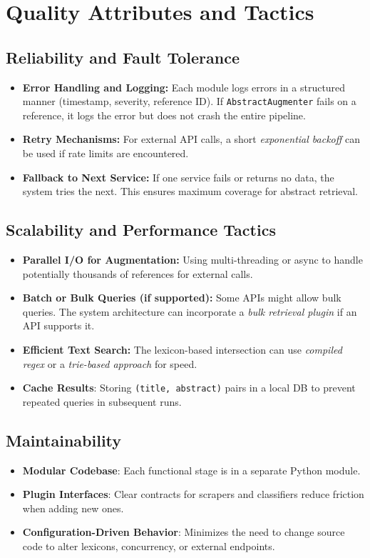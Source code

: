 \documentclass[12pt]{article}
\begin{document}
\section{Quality Attributes and Tactics}

\subsection{Reliability and Fault Tolerance}
\begin{itemize}
  \item \textbf{Error Handling and Logging:} Each module logs errors in a structured manner (timestamp, severity, reference ID). If \texttt{AbstractAugmenter} fails on a reference, it logs the error but does not crash the entire pipeline.
  \item \textbf{Retry Mechanisms:} For external API calls, a short \emph{exponential backoff} can be used if rate limits are encountered.
  \item \textbf{Fallback to Next Service:} If one service fails or returns no data, the system tries the next. This ensures maximum coverage for abstract retrieval.
\end{itemize}

\subsection{Scalability and Performance Tactics}
\begin{itemize}
  \item \textbf{Parallel I/O for Augmentation:} Using multi-threading or async to handle potentially thousands of references for external calls.
  \item \textbf{Batch or Bulk Queries (if supported):} Some APIs might allow bulk queries. The system architecture can incorporate a \emph{bulk retrieval plugin} if an API supports it.
  \item \textbf{Efficient Text Search:} The lexicon-based intersection can use \emph{compiled regex} or a \emph{trie-based approach} for speed. 
  \item \textbf{Cache Results}: Storing \texttt{(title, abstract)} pairs in a local DB to prevent repeated queries in subsequent runs.
\end{itemize}

\subsection{Maintainability}
\begin{itemize}
  \item \textbf{Modular Codebase}: Each functional stage is in a separate Python module. 
  \item \textbf{Plugin Interfaces}: Clear contracts for scrapers and classifiers reduce friction when adding new ones.
  \item \textbf{Configuration-Driven Behavior}: Minimizes the need to change source code to alter lexicons, concurrency, or external endpoints.
\end{itemize}
\end{document}
